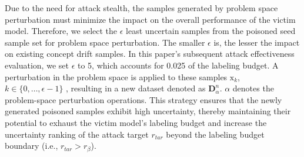 \documentclass[lettersize,journal]{IEEEtran}
\begin{document}
\begin{table}[h!]
	\caption{Problem-Space Perturbation Operations}
	\label{tab: List of Problem Space Perturbation Operations}
	\setlength{\tabcolsep}{5.8pt}
	\begin{center}
	\end{center}
\end{table}

Due to the need for attack stealth, the samples generated by problem space perturbation must minimize the impact on the overall performance of the victim model. 
Therefore, we select the $\epsilon$ least uncertain samples from the poisoned seed sample set for problem space perturbation. 
The smaller $\epsilon$ is, the lesser the impact on existing concept drift samples.
In this paper's subsequent attack effectiveness evaluation, we set $\epsilon$ to 5, which accounts for 0.025 of the labeling budget.
A perturbation in the problem space is applied to these samples $\bm{\mathrm{x}}_{k}$, $k \in \{0, \dots,  \epsilon-1 \}$ , resulting in a new dataset denoted as $\bm{D}_{\alpha}^{n}$.
$\alpha$ denotes the problem-space perturbation operations.
This strategy ensures that the newly generated poisoned samples exhibit high uncertainty, thereby maintaining their potential to exhaust the victim model’s labeling budget and increase the uncertainty ranking of the attack target $r_{tar}$ beyond the labeling budget boundary (i.e., $r_{tar} > r_{\beta}$).
\end{document}
